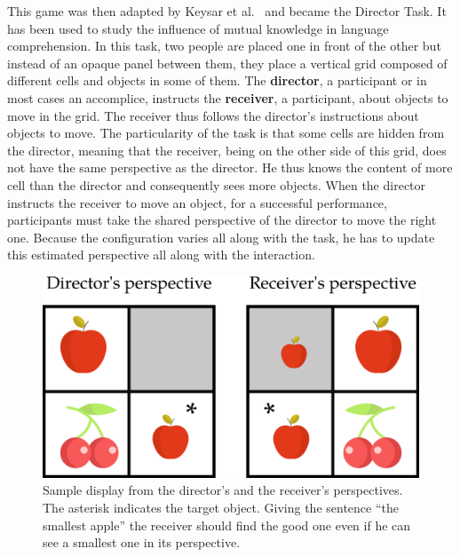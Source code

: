 This game was then adapted by Keysar et al.~\cite{keysar_2000_taking} and became the Director Task. It has been used to study the influence of mutual knowledge in language comprehension. In this task, two people are placed one in front of the other but instead of an opaque panel between them, they place a vertical grid composed of different cells and objects in some of them. The \textbf{director}, a participant or in most cases an accomplice, instructs the \textbf{receiver}, a participant, about objects to move in the grid. The receiver thus follows the director's instructions about objects to move. The particularity of the task is that some cells are hidden from the director, meaning that the receiver, being on the other side of this grid, does not have the same perspective as the director. He thus knows the content of more cell than the director and consequently sees more objects. When the director instructs the receiver to move an object, for a successful performance, participants must take the shared perspective of the director to move the right one. Because the configuration varies all along with the task, he has to update this estimated perspective all along with the interaction.

\begin{figure}[ht!]
\centering
\includegraphics[scale=0.25]{figures/chapter9/dt_apple.png}
\caption{\label{fig:chap9_dt_apple} Sample display from the director's and the receiver's perspectives. The asterisk indicates the target object. Giving the sentence ``the smallest apple'' the receiver should find the good one even if he can see a smallest one in its perspective. }
\end{figure}

